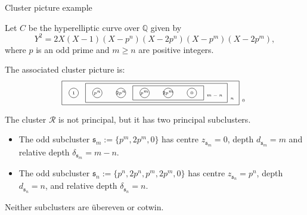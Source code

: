 \documentclass[10pt]{beamer}
\begin{document}
\begin{frame}[t]{Cluster picture example}

Let $ C $ be the hyperelliptic curve over $ \mathbb{Q} $ given by
$$ Y^2 = 2X(X - 1)(X - p^n)(X - 2p^n)(X - p^m)(X - 2p^m), $$
where $ p $ is an odd prime and $ m \ge n $ are positive integers.

\vspace{0.5cm} The associated cluster picture is:
$$
\begin{tikzpicture}
\draw (0, 0) rectangle (7.5, -1) node[above right]{\tiny $ 0 $};
\draw (0.5, -0.5) circle (0.2) node{\tiny $ 1 $};
\draw (1, -0.1) rectangle (7, -0.9) node[above right]{\tiny $ n $};
\draw (1.5, -0.5) circle (0.2) node{\tiny $ p^n $};
\draw (2.5, -0.5) circle (0.2) node{\tiny $ 2p^n $};
\draw (3, -0.2) rectangle (6, -0.8) node[above right]{\tiny $ m - n $};
\draw (3.5, -0.5) circle (0.2) node{\tiny $ p^m $};
\draw (4.5, -0.5) circle (0.2) node{\tiny $ 2p^m $};
\draw (5.5, -0.5) circle (0.2) node{\tiny $ 0 $};
\end{tikzpicture}
$$

The cluster $ \mathcal{R} $ is not principal, but it has two principal subclusters.
\begin{itemize}
\item The odd subcluster $ \mathfrak{s}_m := \{p^m, 2p^m, 0\} $ has centre $ z_{\mathfrak{s}_m} = 0 $, depth $ d_{\mathfrak{s}_m} = m $ and relative depth $ \delta_{\mathfrak{s}_m} = m - n $.
\item The odd subcluster $ \mathfrak{s}_n := \{p^n, 2p^n, p^m, 2p^m, 0\} $ has centre $ z_{\mathfrak{s}_n} = p^n $, depth $ d_{\mathfrak{s}_n} = n $, and relative depth $ \delta_{\mathfrak{s}_n} = n $.
\end{itemize}
Neither subclusters are \"ubereven or cotwin.

\end{frame}
\end{document}

